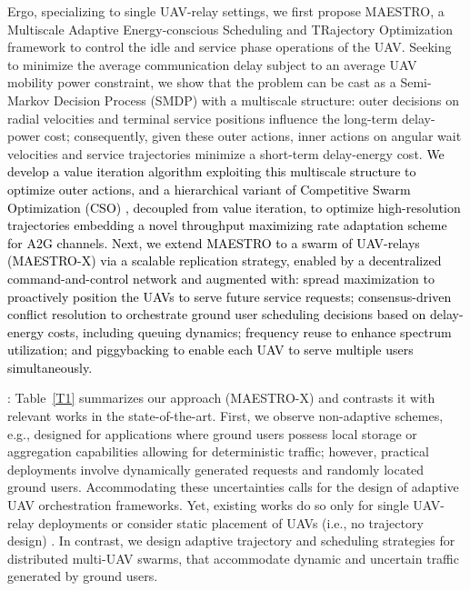 \documentclass[10pt, twocolumn]{IEEEtran}
\theoremstyle{plain}
\theoremstyle{definition}
\theoremstyle{remark}
\newcommand\hlt[1]{\textcolor{black}{#1}}
\begin{document}
Ergo, specializing to single UAV-relay settings, we first propose MAESTRO, a Multiscale Adaptive Energy-conscious Scheduling and TRajectory Optimization framework to control the idle and service phase operations of the UAV. Seeking to minimize the average communication delay subject to an average UAV mobility power constraint, we show that the problem can be cast as a Semi-Markov Decision Process (SMDP) with a multiscale structure: outer decisions on radial velocities and terminal service positions influence the long-term delay-power cost; consequently, given these outer actions, inner actions on angular wait velocities and service trajectories minimize a short-term delay-energy cost. \hlt{We develop a value iteration algorithm \cite{Bertsekas} exploiting this multiscale structure to optimize outer actions, and a hierarchical variant of Competitive Swarm Optimization (CSO) \cite{CSO}, decoupled from value iteration, to optimize high-resolution trajectories embedding a novel throughput maximizing rate adaptation scheme for A2G channels. Next, we extend MAESTRO to a swarm of UAV-relays (MAESTRO-X) via a scalable replication strategy, enabled by a decentralized command-and-control network and augmented with: spread maximization to proactively position the UAVs to serve future service requests; consensus-driven conflict resolution to orchestrate ground user scheduling decisions based on delay-energy costs, including queuing dynamics; frequency reuse to enhance spectrum utilization; and piggybacking to enable each UAV to serve multiple users simultaneously.}

: Table~\ref{T1} summarizes our approach (MAESTRO-X) and contrasts it with relevant works in the state-of-the-art. First, we observe non-adaptive schemes, e.g., \cite{SCA, JointTrajectoryDesign, MultiDroneDeployment} designed for applications where ground users possess local storage or aggregation capabilities allowing for deterministic traffic; however, practical deployments involve dynamically generated requests and randomly located ground users. Accommodating these uncertainties calls for the design of adaptive UAV orchestration frameworks. Yet, existing works do so only for single UAV-relay deployments \cite{UAV-DRL} or consider static placement of UAVs (i.e., no trajectory design) \cite{UAVDynamicCoverage, DQNPositioning, MLDeployment}. In contrast, we design adaptive trajectory and scheduling strategies for distributed multi-UAV swarms, that accommodate dynamic and uncertain traffic generated by ground users.
\end{document}

